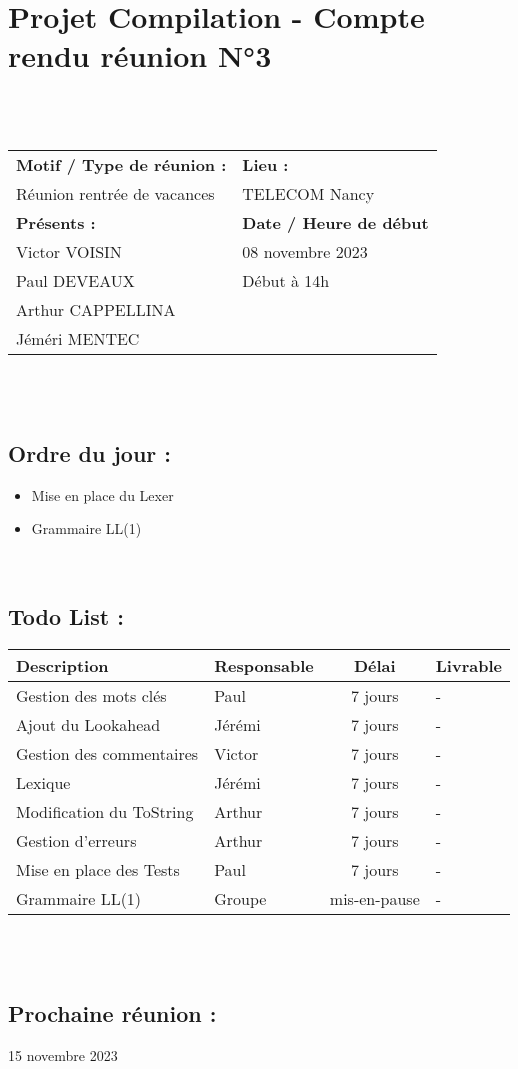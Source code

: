 \documentclass{article}
\begin{document}
\section*{Projet Compilation - Compte rendu réunion N°3}
~\\\\
\begin{tabular}{|p{7cm}|p{6cm}|}
    \hline
    \textbf{Motif / Type de réunion :}
    & \textbf{Lieu :}
    \\
    Réunion rentrée de vacances
    &
    TELECOM Nancy
    \\ \hline
    \textbf{Présents :}
    &
    \textbf{Date / Heure de début}
    \\
    Victor VOISIN &  08 novembre 2023\\
    Paul DEVEAUX & Début à 14h\\
    Arthur CAPPELLINA & \\
    Jéméri MENTEC &
    \\ \hline
\end{tabular}
\\\\

\subsection*{Ordre du jour :}
\begin{itemize}
    \item{Mise en place du Lexer}
    \item{Grammaire LL(1)}
\end{itemize}
~

\subsection*{Todo List :}
\renewcommand{\arraystretch}{1.5}
\begin{tabular}{|p{5cm}|l|c|p{4.5cm}|}
    \hline
    Description & Responsable & Délai & Livrable\\ 
    \hline
    Gestion des mots clés & Paul  & 7 jours & - \\
    Ajout du Lookahead & Jérémi  & 7 jours & -\\
    Gestion des commentaires & Victor  & 7 jours & -\\
    Lexique & Jérémi  & 7 jours & -\\
    Modification du ToString & Arthur  & 7 jours & -\\
    Gestion d'erreurs & Arthur  & 7 jours & -\\
    Mise en place des Tests & Paul  & 7 jours & -\\
    Grammaire LL(1) & Groupe & mis-en-pause & -\\
    \hline
\end{tabular}
\\\\

\subsection*{Prochaine réunion :} 15 novembre 2023
\end{document}
